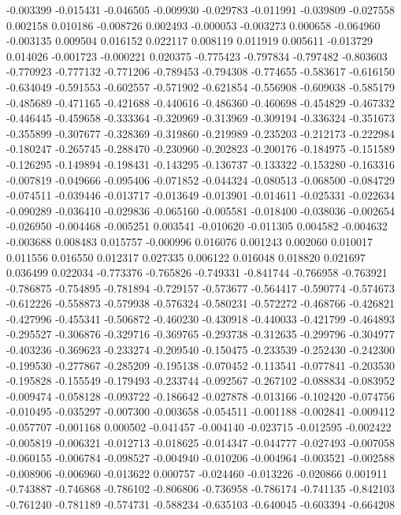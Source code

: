 -0.003399
-0.015431
-0.046505
-0.009930
-0.029783
-0.011991
-0.039809
-0.027558
0.002158
0.010186
-0.008726
0.002493
-0.000053
-0.003273
0.000658
-0.064960
-0.003135
0.009504
0.016152
0.022117
0.008119
0.011919
0.005611
-0.013729
0.014026
-0.001723
-0.000221
0.020375
-0.775423
-0.797834
-0.797482
-0.803603
-0.770923
-0.777132
-0.771206
-0.789453
-0.794308
-0.774655
-0.583617
-0.616150
-0.634049
-0.591553
-0.602557
-0.571902
-0.621854
-0.556908
-0.609038
-0.585179
-0.485689
-0.471165
-0.421688
-0.440616
-0.486360
-0.460698
-0.454829
-0.467332
-0.446445
-0.459658
-0.333364
-0.320969
-0.313969
-0.309194
-0.336324
-0.351673
-0.355899
-0.307677
-0.328369
-0.319860
-0.219989
-0.235203
-0.212173
-0.222984
-0.180247
-0.265745
-0.288470
-0.230960
-0.202823
-0.200176
-0.184975
-0.151589
-0.126295
-0.149894
-0.198431
-0.143295
-0.136737
-0.133322
-0.153280
-0.163316
-0.007819
-0.049666
-0.095406
-0.071852
-0.044324
-0.080513
-0.068500
-0.084729
-0.074511
-0.039446
-0.013717
-0.013649
-0.013901
-0.014611
-0.025331
-0.022634
-0.090289
-0.036410
-0.029836
-0.065160
-0.005581
-0.018400
-0.038036
-0.002654
-0.026950
-0.004468
-0.005251
0.003541
-0.010620
-0.011305
0.004582
-0.004632
-0.003688
0.008483
0.015757
-0.000996
0.016076
0.001243
0.002060
0.010017
0.011556
0.016550
0.012317
0.027335
0.006122
0.016048
0.018820
0.021697
0.036499
0.022034
-0.773376
-0.765826
-0.749331
-0.841744
-0.766958
-0.763921
-0.786875
-0.754895
-0.781894
-0.729157
-0.573677
-0.564417
-0.590774
-0.574673
-0.612226
-0.558873
-0.579938
-0.576324
-0.580231
-0.572272
-0.468766
-0.426821
-0.427996
-0.455341
-0.506872
-0.460230
-0.430918
-0.440033
-0.421799
-0.464893
-0.295527
-0.306876
-0.329716
-0.369765
-0.293738
-0.312635
-0.299796
-0.304977
-0.403236
-0.369623
-0.233274
-0.209540
-0.150475
-0.233539
-0.252430
-0.242300
-0.199530
-0.277867
-0.285209
-0.195138
-0.070452
-0.113541
-0.077841
-0.203530
-0.195828
-0.155549
-0.179493
-0.233744
-0.092567
-0.267102
-0.088834
-0.083952
-0.009474
-0.058128
-0.093722
-0.186642
-0.027878
-0.013166
-0.102420
-0.074756
-0.010495
-0.035297
-0.007300
-0.003658
-0.054511
-0.001188
-0.002841
-0.009412
-0.057707
-0.001168
0.000502
-0.041457
-0.004140
-0.023715
-0.012595
-0.002422
-0.005819
-0.006321
-0.012713
-0.018625
-0.014347
-0.044777
-0.027493
-0.007058
-0.060155
-0.006784
-0.098527
-0.004940
-0.010206
-0.004964
-0.003521
-0.002588
-0.008906
-0.006960
-0.013622
0.000757
-0.024460
-0.013226
-0.020866
0.001911
-0.743887
-0.746868
-0.786102
-0.806806
-0.736958
-0.786174
-0.741135
-0.842103
-0.761240
-0.781189
-0.574731
-0.588234
-0.635103
-0.640045
-0.603394
-0.664208
